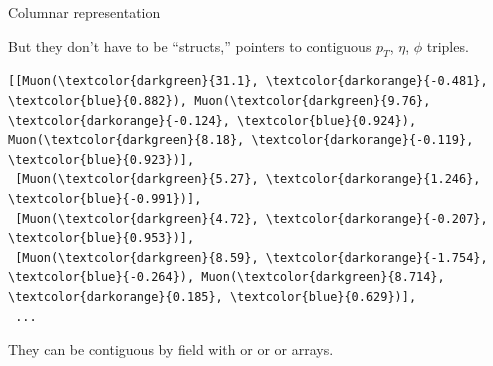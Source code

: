 \documentclass[aspectratio=169]{beamer}
\begin{document}
\begin{frame}[fragile]{Columnar representation}
\vspace{0.5 cm}

But they don't have to be ``structs,'' pointers to contiguous $p_T$, $\eta$, $\phi$ triples.

\scriptsize
\begin{Verbatim}[commandchars=\\\{\}]
[[Muon(\textcolor{darkgreen}{31.1}, \textcolor{darkorange}{-0.481}, \textcolor{blue}{0.882}), Muon(\textcolor{darkgreen}{9.76}, \textcolor{darkorange}{-0.124}, \textcolor{blue}{0.924}), Muon(\textcolor{darkgreen}{8.18}, \textcolor{darkorange}{-0.119}, \textcolor{blue}{0.923})],
 [Muon(\textcolor{darkgreen}{5.27}, \textcolor{darkorange}{1.246}, \textcolor{blue}{-0.991})],
 [Muon(\textcolor{darkgreen}{4.72}, \textcolor{darkorange}{-0.207}, \textcolor{blue}{0.953})],
 [Muon(\textcolor{darkgreen}{8.59}, \textcolor{darkorange}{-1.754}, \textcolor{blue}{-0.264}), Muon(\textcolor{darkgreen}{8.714}, \textcolor{darkorange}{0.185}, \textcolor{blue}{0.629})],
 ...
\end{Verbatim}
\normalsize

\vspace{0.5 cm}
They can be contiguous by field with  or  or  or  arrays.


\end{frame}
\end{document}
